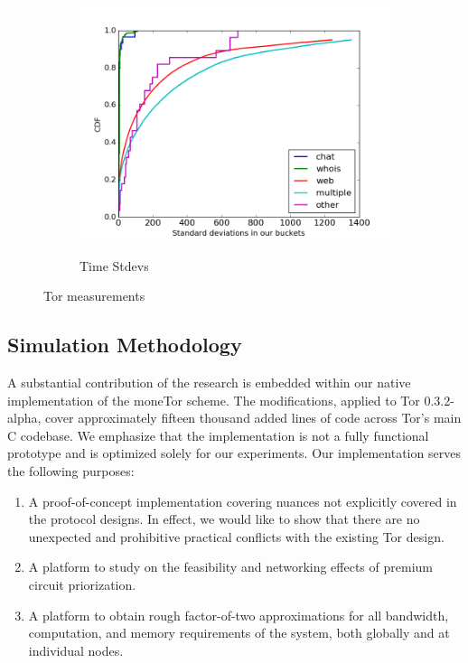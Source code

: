 \begin{figure}
\begin{subfigure}[t]{0.32\textwidth}
\includegraphics[scale=0.3]{images/stddevs.png}
		\label{fig:stats_c}
		\caption{Time Stdevs}
	\end{subfigure}
	\label{fig:measurements}
	\caption{Tor measurements}
\end{figure}

\subsection{Simulation Methodology}

A substantial contribution of the research is embedded within our native
implementation of the moneTor scheme. The modifications, applied to Tor
0.3.2-alpha, cover approximately fifteen thousand added lines of code across
Tor's main C codebase. We emphasize that the implementation is not a fully
functional prototype and is optimized solely for our experiments. Our
implementation serves the following purposes:

\begin{enumerate}
\item A proof-of-concept implementation covering nuances not explicitly
  covered in the protocol designs. In effect, we would like to show that there
  are no unexpected and prohibitive practical conflicts with the existing Tor
  design.
\item A platform to study on the feasibility and networking effects of premium
  circuit priorization.
\item A platform to obtain rough factor-of-two approximations for all bandwidth,
  computation, and memory requirements of the system, both globally and at
  individual nodes.
\end{enumerate}

